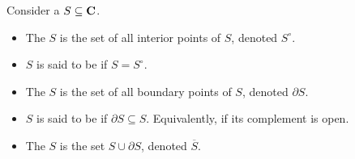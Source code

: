 \vspace*{1em}

\begin{definition}
Consider a $S \subseteq \mathbf C$.
\begin{itemize}
\item The  {\color{blue}$S$} is the set of all interior points of $S$, denoted $S^\circ$.
\item $S$ is said to be  if $S = S^\circ$.
\item The  {\color{blue}$S$} is the set of all boundary points of $S$, denoted $\partial S$.
\item $S$ is said to be  if $\partial S \subseteq S$. Equivalently, if its complement is open.
\item The  {\color{blue}$S$} is the set $S \cup \partial S$, denoted $\overline{S}$.
\end{itemize}
\end{definition}

\vspace*{1em}


